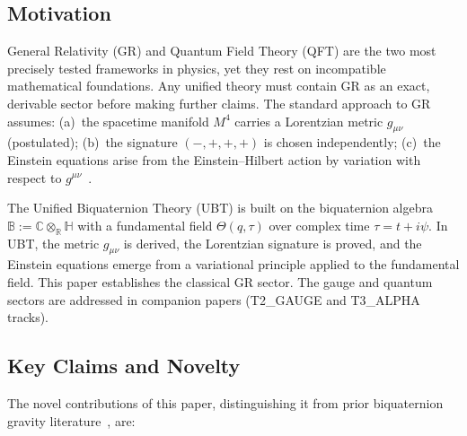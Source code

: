 \documentclass[12pt,a4paper]{article}
\theoremstyle{definition}
\theoremstyle{remark}
\newcommand{\BB}{\mathbb{B}}
\newcommand{\CC}{\mathbb{C}}
\newcommand{\RR}{\mathbb{R}}
\newcommand{\HH}{\mathbb{H}}
\begin{document}
\subsection{Motivation}

General Relativity (GR) and Quantum Field Theory (QFT) are the two most
precisely tested frameworks in physics, yet they rest on incompatible
mathematical foundations.
Any unified theory must contain GR as an exact, derivable sector before
making further claims.
The standard approach to GR assumes:
(a)~the spacetime manifold $M^4$ carries a Lorentzian metric $g_{\mu\nu}$
(postulated);
(b)~the signature $(-,+,+,+)$ is chosen independently;
(c)~the Einstein equations arise from the Einstein--Hilbert action by
variation with respect to $g^{\mu\nu}$~\cite{einstein1915,hilbert1915}.

The Unified Biquaternion Theory (UBT) is built on the biquaternion algebra
$\BB := \CC\otimes_\RR\HH$ with a fundamental field
$\Theta(q,\tau)$ over complex time $\tau = t + i\psi$.
In UBT, the metric $g_{\mu\nu}$ is derived, the Lorentzian signature is proved,
and the Einstein equations emerge from a variational principle applied to
the fundamental field.
This paper establishes the classical GR sector.
The gauge and quantum sectors are addressed in companion papers
(T2\_GAUGE and T3\_ALPHA tracks).

\subsection{Key Claims and Novelty}

The novel contributions of this paper, distinguishing it from prior biquaternion
gravity literature~\cite{adler1995,finkelstein1962,deleo1996}, are:
\end{document}
